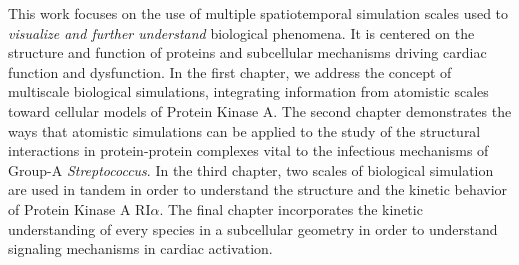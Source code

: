 \documentclass[12pt]{ucsddissertation}
\begin{document}
\begin{vita}
\end{vita}


 

\begin{dissertationabstract}
\vspace{0.3pt}

This work focuses on the use of multiple spatiotemporal simulation scales used to \textit{visualize and further understand} biological phenomena. It is centered on the structure and function of proteins and subcellular mechanisms driving cardiac function and dysfunction. In the first chapter, we address the concept of multiscale biological simulations, integrating information from atomistic scales toward cellular models of Protein Kinase A. The second chapter demonstrates the ways that atomistic simulations can be applied to the study of the structural interactions in protein-protein complexes vital to the infectious mechanisms of Group-A \textit{Streptococcus}. In the third chapter, two scales of biological simulation are used in tandem in order to understand the structure and the kinetic behavior of Protein Kinase A RI$\alpha$. The final chapter incorporates the kinetic understanding of every species in a subcellular geometry in order to understand signaling mechanisms in cardiac activation.  



\end{dissertationabstract}
\end{document}
